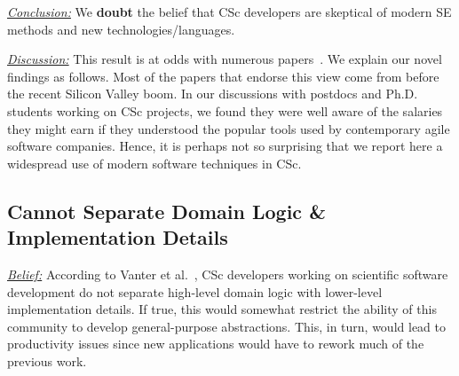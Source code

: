 \documentclass[conference,10pt]{IEEEtran}
\newenvironment{RQ}{\vspace{1mm}\begin{tcolorbox}[enhanced,width=3.4in,size=fbox,colback=red!5!white,drop shadow southeast,sharp corners]}{\end{tcolorbox}}
\begin{document}
\begin{RQ} 
\textit{\underline{Conclusion:}} We \textbf{doubt} the belief that 
CSc developers are skeptical of modern SE methods and new technologies/languages.
\end{RQ}

\noindent \textit{\underline{Discussion:}} This result is at odds
with numerous papers~\cite{basili08_hpc, carver07_environment, Prabhu11_cssurvey, kendall05_C, ragan14_pythoncs}. We explain our novel findings as follows. 
Most of the papers that endorse this view come from before the recent Silicon Valley boom. In our discussions with postdocs and Ph.D. students working on CSc projects,
we found they were well aware of the salaries they might earn if they understood the popular tools used by contemporary agile software companies. 
Hence, it is perhaps not so surprising that we report here a widespread use of modern software techniques in CSc.
 


\subsection{Cannot Separate Domain Logic \& Implementation Details} 






\noindent \textit{\underline{Belief:}} 
According to Vanter et al.~\cite{faulk09_secs},
CSc developers working on scientific software development do not separate high-level domain logic with
lower-level implementation details. If true, this would somewhat restrict the ability
of this community to develop general-purpose abstractions. This, in turn, would lead
to productivity issues since new applications would have to rework much of the previous
work. 
\end{document}
